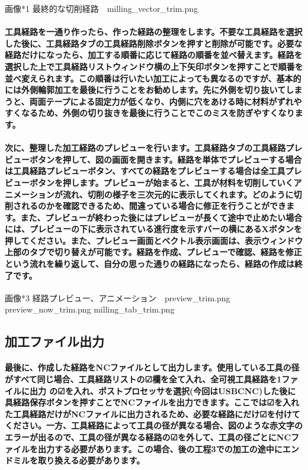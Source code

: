 \documentclass[b5paper, 9pt, twocolumn, titlepage,openany]{jsbook}%
\begin{document}
画像*1 最終的な切削経路　milling_vector_trim.png

\paragraph{工具経路を一通り作ったら、作った経路の整理をします。不要な工具経路を選択した後に、工具経路タブの工具経路削除ボタンを押すと削除が可能です。必要な経路だけになったら、加工する順番に応じて経路の順番を並べ替えます。経路を選択した上で工具経路リストウィンドウ横の上下矢印ボタンを押すことで順番を並べ変えられます。この順番は行いたい加工によっても異なるのですが、基本的には外側輪郭加工を最後に行うことをお勧めします。先に外側を切り抜いてしまうと、両面テープによる固定力が低くなり、内側に穴をあける時に材料がずれやすくなるため、外側の切り抜きを最後に行うことでこのミスを防ぎやすくなります。}

\paragraph{次に、整理した加工経路のプレビューを行います。工具経路タブの工具経路プレビューボタンを押して、図の画面を開きます。経路を単体でプレビューする場合は工具経路プレビューボタン、すべての経路をプレビューする場合は全工具プレビューボタンを押します。プレビューが始まると、工具が材料を切削していくアニメーションが流れ、切削の様子を三次元的に表示してくれます。どのように切削されるのかを確認できるため、間違っている場合に修正を行うことができます。また、プレビューが終わった後にはプレビューが長くて途中で止めたい場合には、プレビューの下に表示されている進行度を示すバーの横にあるXボタンを押してください。また、プレビュー画面とベクトル表示画面は、表示ウィンドウ上部のタブで切り替えが可能です。経路を作成、プレビューで確認、経路を修正 という流れを繰り返して、自分の思った通りの経路になったら、経路の作成は終了です。}

画像*3 経路プレビュー、アニメーション　preview_trim.png preview_now_trim.png milling_tab_trim.png

\subsection{加工ファイル出力}

\paragraph{最後に、作成した経路をNCファイルとして出力します。使用している工具の径がすべて同じ場合、工具経路リストの☑欄を全て入れ、全可視工具経路を1ファイルに出力 の☑を入れ、ポストプロセッサを選択(今回はUSBCNC)した後に具経路保存ボタンを押すことでNCファイルを出力できます。ここでは☑を入れた工具経路だけがNCファイルに出力されるため、必要な経路にだけ☑を付けてください。一方、工具経路によって工具の径が異なる場合、図のような赤文字のエラーが出るので、工具の径が異なる経路の☑を外して、工具の径ごとにNCファイルを出力する必要があります。この場合、後の工程3での加工の途中にエンドミルを取り換える必要があります。}
\end{document}
